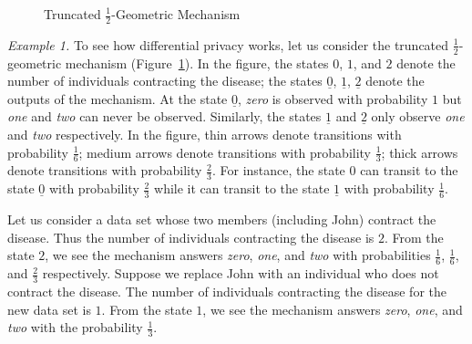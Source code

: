\begin{figure}
{
    }
  \caption{Truncated $\frac{1}{2}$-Geometric Mechanism}
  \label{figure:geometric-mechanism}
\end{figure}

\noindent
\textit{Example 1.}
To see how differential privacy works, let us consider the truncated
$\frac{1}{2}$-geometric mechanism
(Figure~\ref{figure:geometric-mechanism}). 
In the figure, the states $0$, $1$, and $2$ denote the number of
individuals contracting the disease; the states $\underline{0}$,
$\underline{1}$, $\underline{2}$ denote the outputs of the
mechanism. At the state $\underline{0}$, \textit{zero} is observed
with probability $1$ but \textit{one} and \textit{two} can never be 
observed. Similarly, the states $\underline{1}$ and $\underline{2}$
only observe \textit{one} and \textit{two} respectively. 
In the figure, thin arrows denote transitions with probability
$\frac{1}{6}$; medium arrows denote transitions with probability
$\frac{1}{3}$; thick arrows denote transitions with probability
$\frac{2}{3}$. For instance, the state $0$ can transit to the state
$\underline{0}$ with probability $\frac{2}{3}$ while it can transit to
the state $\underline{1}$ with probability $\frac{1}{6}$.

Let us consider a data set whose two members (including John) contract
the disease. Thus the number of individuals contracting the disease is
$2$. From the state $2$, we see the mechanism answers
\textit{zero}, \textit{one}, and \textit{two} with probabilities
$\frac{1}{6}$, $\frac{1}{6}$, and $\frac{2}{3}$ respectively. 
Suppose we replace John with an individual who does not contract
the disease. The number of individuals contracting the disease for the
new data set is $1$. From the state $1$, we see the mechanism answers
\textit{zero}, \textit{one}, and \textit{two} with the probability
$\frac{1}{3}$.

